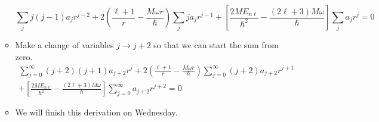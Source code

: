 \documentclass[../notes.tex]{subfiles}
\begin{document}
\begin{itemize}
\begin{itemize}
\begin{equation*}
            \sum_jj(j-1)a_jr^{j-2}+2\left( \frac{\ell+1}{r}-\frac{M\omega r}{\hbar} \right)\sum_jja_jr^{j-1}+\left[ \frac{2ME_{n\ell}}{\hbar^2}-\frac{(2\ell+3)M\omega}{\hbar} \right]\sum_ja_jr^j = 0
        \end{equation*}
        \item Make a change of variables $j\to j+2$ so that we can start the sum from zero.
        \begin{multline*}
            \sum_{j=0}^\infty(j+2)(j+1)a_{j+2}r^j+2\left( \frac{\ell+1}{r}-\frac{M\omega r}{\hbar} \right)\sum_{j=0}^\infty(j+2)a_{j+2}r^{j+1}\\
            +\left[ \frac{2ME_{n\ell}}{\hbar^2}-\frac{(2\ell+3)M\omega}{\hbar} \right]\sum_{j=0}^\infty a_{j+2}r^{j+2} = 0
        \end{multline*}
        \item We will finish this derivation on Wednesday.
    \end{itemize}
\end{itemize}
\end{document}
